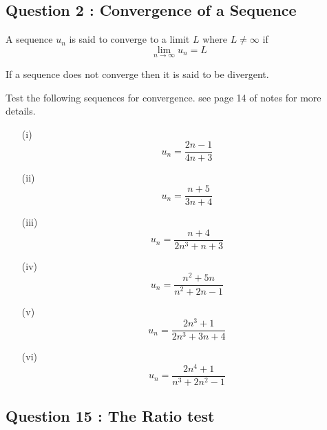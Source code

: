 \documentclass[]{article}
\begin{document}
\subsection*{Question 2 : Convergence of a Sequence}

\begin{framed}
	A sequence $u_n$
	is said to converge to a limit $L$ where $L \neq \infty$ if
	\[ \lim_{n \to \infty } u_n = L \]
	
	
	
	
	If a sequence does not converge then it is said to be divergent. \end{framed}
%
Test the following sequences for convergence. see page 14 of notes for more details.
\begin{multicols}{2}
	\begin{itemize}
		\item[(i)] \[u_n = \frac{2n-1}{4n+3}\]
		
		\item[(ii)] \[u_n = \frac{n+5}{3n+4}\]
		
		\item[(iii)] \[u_n = \frac{n+4}{2n^3 + n +3}\]
		
		\item[(iv)] \[u_n = \frac{n^2 +5n }{n^2 + 2n -1}\]
		
		\item[(v)] \[u_n = \frac{2n^3+1}{2n^3 +3n +4 } \]
		
		\item[(vi)]\[u_n =  \frac{2n^4+1}{n^3 +2n^2 -1 } \]
		
	\end{itemize}	
\end{multicols}
\subsection*{Question 15 : The Ratio test}
\end{document}
